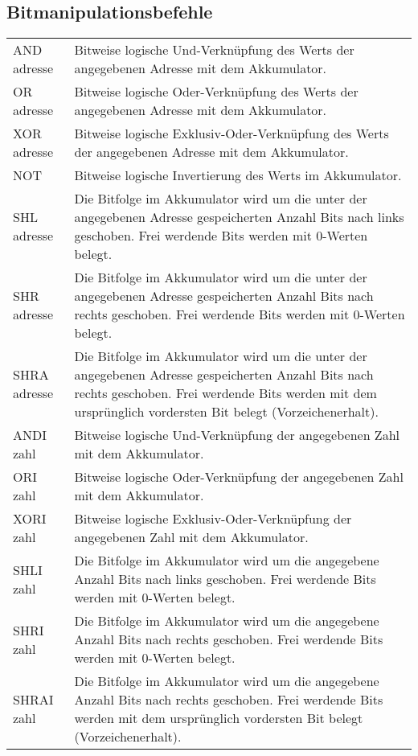 \documentclass{lehramt-informatik-haupt}
\begin{document}
\subsection{Bitmanipulationsbefehle}

\begin{tabularx}{\linewidth}{lX}
AND adresse   & Bitweise logische Und-Verknüpfung des Werts der angegebenen Adresse mit dem Akkumulator. \\
OR adresse    & Bitweise logische Oder-Verknüpfung des Werts der angegebenen Adresse mit dem Akkumulator. \\
XOR adresse   & Bitweise logische Exklusiv-Oder-Verknüpfung des Werts der angegebenen Adresse mit dem Akkumulator. \\
NOT           & Bitweise logische Invertierung des Werts im Akkumulator. \\
SHL adresse   & Die Bitfolge im Akkumulator wird um die unter der angegebenen Adresse gespeicherten Anzahl Bits nach links geschoben. Frei werdende Bits werden mit 0-Werten belegt. \\
SHR adresse   & Die Bitfolge im Akkumulator wird um die unter der angegebenen Adresse gespeicherten Anzahl Bits nach rechts geschoben. Frei werdende Bits werden mit 0-Werten belegt. \\
SHRA adresse  & Die Bitfolge im Akkumulator wird um die unter der angegebenen Adresse gespeicherten Anzahl Bits nach rechts geschoben. Frei werdende Bits werden mit dem ursprünglich vordersten Bit belegt (Vorzeichenerhalt). \\
ANDI zahl     & Bitweise logische Und-Verknüpfung der angegebenen Zahl mit dem Akkumulator. \\
ORI zahl      & Bitweise logische Oder-Verknüpfung der angegebenen Zahl mit dem Akkumulator. \\
XORI zahl     & Bitweise logische Exklusiv-Oder-Verknüpfung der angegebenen Zahl mit dem Akkumulator. \\
SHLI zahl     & Die Bitfolge im Akkumulator wird um die angegebene Anzahl Bits nach links geschoben. Frei werdende Bits werden mit 0-Werten belegt. \\
SHRI zahl     & Die Bitfolge im Akkumulator wird um die angegebene Anzahl Bits nach rechts geschoben. Frei werdende Bits werden mit 0-Werten belegt. \\
SHRAI zahl    & Die Bitfolge im Akkumulator wird um die angegebene Anzahl Bits nach rechts geschoben. Frei werdende Bits werden mit dem ursprünglich vordersten Bit belegt (Vorzeichenerhalt). \\
\end{tabularx}
\end{document}
